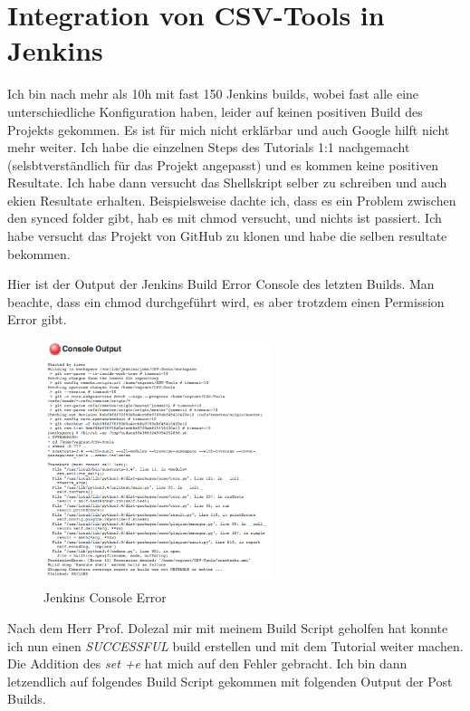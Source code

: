 \section{Integration von CSV-Tools in Jenkins}
\label{sec:Integration}

Ich bin nach mehr als 10h mit fast 150 Jenkins builds, wobei fast alle eine unterschiedliche Konfiguration haben, leider auf keinen positiven Build des Projekts gekommen. Es ist für mich nicht erklärbar und auch Google hilft nicht mehr weiter. Ich habe die einzelnen Steps des Tutorials 1:1 nachgemacht (selsbtverständlich für das Projekt angepasst) und es kommen keine positiven Resultate. Ich habe dann versucht das Shellskript selber zu schreiben und auch ekien Resultate erhalten. Beispielsweise dachte ich, dass es ein Problem zwischen den synced folder gibt, hab es mit chmod versucht, und nichts ist passiert. Ich habe versucht das Projekt von GitHub zu klonen und habe die selben resultate bekommen. 

Hier ist der Output der Jenkins Build Error Console des letzten Builds. Man beachte, dass ein chmod durchgeführt wird, es aber trotzdem einen Permission Error gibt.

\begin{figure}[!h]
	\caption{Jenkins Console Error}
	\centering
	\includegraphics[width=0.6\textwidth]{images/jenkins_consoleError.png}
\end{figure}

\clearpage

Nach dem Herr Prof. Dolezal mir mit meinem Build Script geholfen hat konnte ich nun einen \textit{SUCCESSFUL} build erstellen und mit dem Tutorial weiter machen. Die Addition des \textit{set +e} hat mich auf den Fehler gebracht. Ich bin dann letzendlich auf folgendes Build Script gekommen mit folgenden Output der Post Builds.

